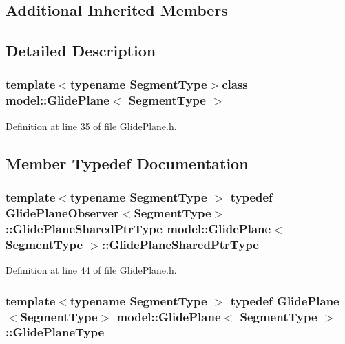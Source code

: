\subsection*{Additional Inherited Members}


\subsection{Detailed Description}
\subsubsection*{template$<$typename Segment\+Type$>$class model\+::\+Glide\+Plane$<$ Segment\+Type $>$}



Definition at line 35 of file Glide\+Plane.\+h.



\subsection{Member Typedef Documentation}
\hypertarget{classmodel_1_1_glide_plane_a3f02a68389497ce7dbcc0c3733ba6a01}{}
\subsubsection[{Glide\+Plane\+Shared\+Ptr\+Type}]{\setlength{\rightskip}{0pt plus 5cm}template$<$typename Segment\+Type $>$ typedef {\bf Glide\+Plane\+Observer}$<$Segment\+Type$>$\+::{\bf Glide\+Plane\+Shared\+Ptr\+Type} {\bf model\+::\+Glide\+Plane}$<$ Segment\+Type $>$\+::{\bf Glide\+Plane\+Shared\+Ptr\+Type}}\label{classmodel_1_1_glide_plane_a3f02a68389497ce7dbcc0c3733ba6a01}


Definition at line 44 of file Glide\+Plane.\+h.

\hypertarget{classmodel_1_1_glide_plane_af25a804a008e811823421118eb164531}{}
\subsubsection[{Glide\+Plane\+Type}]{\setlength{\rightskip}{0pt plus 5cm}template$<$typename Segment\+Type $>$ typedef {\bf Glide\+Plane}$<$Segment\+Type$>$ {\bf model\+::\+Glide\+Plane}$<$ Segment\+Type $>$\+::{\bf Glide\+Plane\+Type}}\label{classmodel_1_1_glide_plane_af25a804a008e811823421118eb164531}


